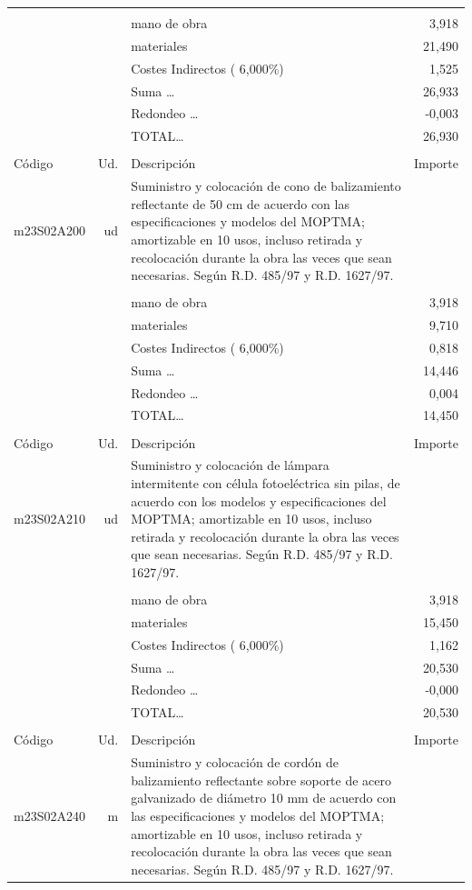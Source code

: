 \begin{supertabular}{l r p{60mm} r}
&&&\\%
&&mano de obra&     3,918\\%
&&materiales&    21,490\\%
&&Costes Indirectos (     6,000\%)&     1,525\\%
&&Suma \ldots&    26,933\\%
&&Redondeo \ldots&    {-}0,003\\%
%
&&TOTAL\ldots&    26,930\\%
&&&\\%
Código&Ud.&Descripción&Importe\\%
\hline%
m23S02A200&ud&Suministro y colocación de cono de balizamiento reflectante de 50 cm de acuerdo con las especificaciones y modelos del MOPTMA; amortizable en 10 usos, incluso retirada y recolocación durante la obra las veces que sean necesarias. Según R.D. 485/97 y R.D. 1627/97.&\\%
&&&\\%
&&mano de obra&     3,918\\%
&&materiales&     9,710\\%
&&Costes Indirectos (     6,000\%)&     0,818\\%
&&Suma \ldots&    14,446\\%
&&Redondeo \ldots&     0,004\\%
%
&&TOTAL\ldots&    14,450\\%
&&&\\%
Código&Ud.&Descripción&Importe\\%
\hline%
m23S02A210&ud&Suministro y colocación de lámpara intermitente con célula fotoeléctrica sin pilas, de acuerdo con los modelos y especificaciones del MOPTMA; amortizable en 10 usos, incluso retirada y recolocación durante la obra las veces que sean necesarias. Según R.D. 485/97 y R.D. 1627/97.&\\%
&&&\\%
&&mano de obra&     3,918\\%
&&materiales&    15,450\\%
&&Costes Indirectos (     6,000\%)&     1,162\\%
&&Suma \ldots&    20,530\\%
&&Redondeo \ldots&    {-}0,000\\%
%
&&TOTAL\ldots&    20,530\\%
&&&\\%
Código&Ud.&Descripción&Importe\\%
\hline%
m23S02A240&m&Suministro y colocación de cordón de balizamiento reflectante sobre soporte de acero galvanizado de diámetro 10 mm de acuerdo con las especificaciones y modelos del MOPTMA; amortizable en 10 usos, incluso retirada y recolocación durante la obra las veces que sean necesarias. Según R.D. 485/97 y R.D. 1627/97.&\\%

\end{supertabular}

